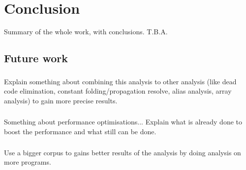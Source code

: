 \documentclass[main.tex]{subfiles}
\begin{document}
    \chapter{Conclusion}\label{chap:conclusion}
    Summary of the whole work, with conclusions. T.B.A.
    \\
    \Blindtext %
    
    \section{Future work}
    
    \paragraph{}
    Explain something about combining this analysis to other analysis (like dead code elimination, constant folding/propagation resolve, alias analysis, array analysis) to gain more precise results.
    \\
    \blindtext %
    
    \paragraph{}
    Something about performance optimisations... Explain what is already done to boost the performance and what still can be done.
    \\
    \blindtext %
        
    \paragraph{}
    Use a bigger corpus to gains better results of the analysis by doing analysis on more programs.
    \\
    \blindtext %
    
\end{document}
